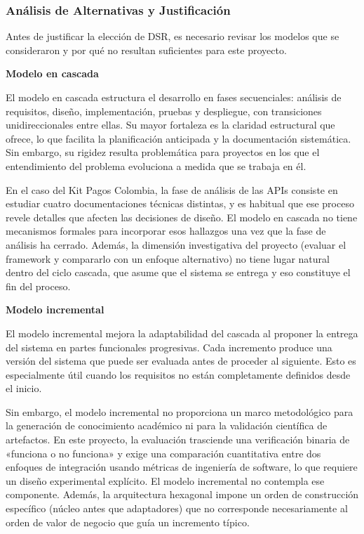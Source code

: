\subsubsection{Análisis de Alternativas y Justificación}

Antes de justificar la elección de DSR, es necesario revisar los modelos que se consideraron y por qué no resultan suficientes para este proyecto.

\textbf{Modelo en cascada}

El modelo en cascada estructura el desarrollo en fases secuenciales: análisis de requisitos, diseño, implementación, pruebas y despliegue, con transiciones unidireccionales entre ellas. Su mayor fortaleza es la claridad estructural que ofrece, lo que facilita la planificación anticipada y la documentación sistemática. Sin embargo, su rigidez resulta problemática para proyectos en los que el entendimiento del problema evoluciona a medida que se trabaja en él.

En el caso del Kit Pagos Colombia, la fase de análisis de las APIs consiste en estudiar cuatro documentaciones técnicas distintas, y es habitual que ese proceso revele detalles que afecten las decisiones de diseño. El modelo en cascada no tiene mecanismos formales para incorporar esos hallazgos una vez que la fase de análisis ha cerrado. Además, la dimensión investigativa del proyecto (evaluar el framework y compararlo con un enfoque alternativo) no tiene lugar natural dentro del ciclo cascada, que asume que el sistema se entrega y eso constituye el fin del proceso.

\textbf{Modelo incremental}

El modelo incremental mejora la adaptabilidad del cascada al proponer la entrega del sistema en partes funcionales progresivas. Cada incremento produce una versión del sistema que puede ser evaluada antes de proceder al siguiente. Esto es especialmente útil cuando los requisitos no están completamente definidos desde el inicio.

Sin embargo, el modelo incremental no proporciona un marco metodológico para la generación de conocimiento académico ni para la validación científica de artefactos. En este proyecto, la evaluación trasciende una verificación binaria de «funciona o no funciona» y exige una comparación cuantitativa entre dos enfoques de integración usando métricas de ingeniería de software, lo que requiere un diseño experimental explícito. El modelo incremental no contempla ese componente. Además, la arquitectura hexagonal impone un orden de construcción específico (núcleo antes que adaptadores) que no corresponde necesariamente al orden de valor de negocio que guía un incremento típico.

